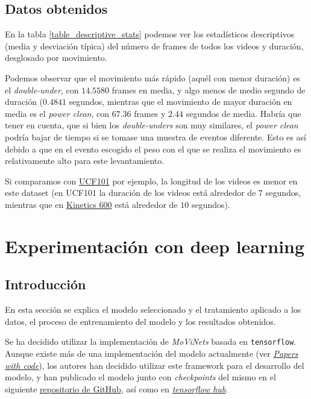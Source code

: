 \subsection{Datos obtenidos}

En la tabla \ref{table_descriptive_stats} podemos ver los estadísticos descriptivos (media y desviación típica) del número de frames de todos los videos y duración, desglosado por movimiento.



Podemos observar que el movimiento más rápido (aquél con menor duración) es el \textit{double-under}, con $14.5580$ frames en media, y algo menos de medio segundo de duración ($0.4841$ segundos, mientras que el movimiento de mayor duración en media es el \textit{power clean}, con $67.36$ frames y $2.44$ segundos de media. Habría que tener en cuenta, que si bien los \textit{double-unders} son muy similares, el \textit{power clean} podría bajar de tiempo si se tomase una muestra de eventos diferente. Esto es así debido a que en el evento escogido el peso con el que se realiza el movimiento es relativamente alto para este levantamiento.

Si comparamos con \href{https://www.crcv.ucf.edu/data/UCF101.php}{UCF101} por ejemplo, la longitud de los videos es menor en este dataset (en UCF101 la duración de los videos está alrededor de $7$ segundos, mientras que en \href{https://www.deepmind.com/open-source/kinetics}{Kinetics 600} está alrededor de $10$ segundos).


\section{Experimentación con deep learning}\label{deep_learning}

\subsection{Introducción}

En esta sección se explica el modelo seleccionado y el tratamiento aplicado a los datos, el proceso de entrenamiento del modelo y los resultados obtenidos.

Se ha decidido utilizar la implementación de \textit{MoViNets} basada en  \texttt{tensorflow}. Aunque existe más de una implementación del modelo actualmente (ver \href{https://paperswithcode.com/paper/movinets-mobile-video-networks-for-efficient}{\textit{Papers with code}}), los autores han decidido utilizar este framework para el desarrollo del modelo, y han publicado el modelo junto con \textit{checkpoints} del mismo en el siguiente \href{https://github.com/tensorflow/models/tree/master/official/projects/movinet}{repositorio de GitHub}, así como en \href{https://tfhub.dev/google/collections/movinet/1}{\textit{tensorflow hub}}.

